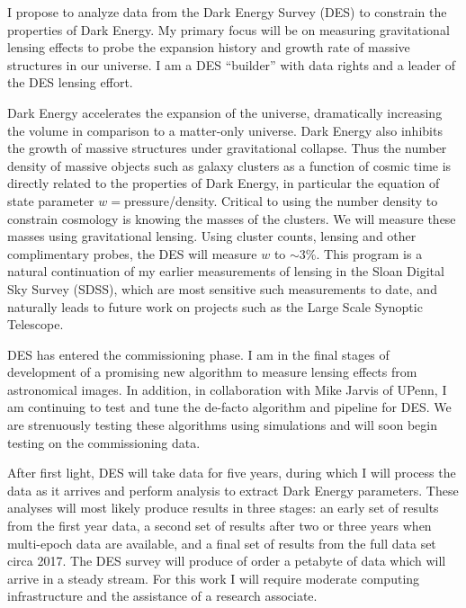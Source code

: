 \documentclass[12pt]{article}
\begin{document}

I propose to analyze data from the Dark Energy Survey (DES) to constrain the
properties of Dark Energy.  My primary focus will be on measuring gravitational
lensing effects to probe the expansion history and growth rate of massive
structures in our universe.  I am a DES ``builder'' with data rights and a
leader of the DES lensing effort.

Dark Energy accelerates the expansion of the universe, dramatically increasing
the volume in comparison to a matter-only universe.  Dark Energy also inhibits
the growth of massive structures under gravitational collapse.  Thus the number
density of massive objects such as galaxy clusters as a function of cosmic time
is directly related to the properties of Dark Energy, in particular the
equation of state parameter $w=$pressure/density.  Critical to using the number
density to constrain cosmology is knowing the masses of the clusters. We will
measure these masses using gravitational lensing.  Using cluster counts,
lensing and other complimentary probes, the DES will measure $w$ to $\sim$3\%.
This program is a natural continuation of my earlier measurements of lensing in
the Sloan Digital Sky Survey (SDSS), which are most sensitive such measurements
to date, and naturally leads to future work on projects such as the Large Scale
Synoptic Telescope\cite{lsstweb}.

DES has entered the commissioning phase.  I am in the final stages of
development of a promising new algorithm to measure lensing effects from
astronomical images.  In addition, in collaboration with Mike Jarvis of UPenn,
I am continuing to test and tune the de-facto algorithm and pipeline for DES.
We are strenuously testing these algorithms using simulations and will soon
begin testing on the commissioning data.

After first light, DES will take data for five years, during which I will
process the data as it arrives and perform analysis to extract Dark Energy
parameters.  These analyses will most likely produce results in three stages:
an early set of results from the first year data, a second set of results after
two or three years when multi-epoch data are available, and a final set of
results from the full data set circa 2017.  The DES survey will produce of
order a petabyte of data which will arrive in a steady stream.  For this work I
will require moderate computing infrastructure and the assistance of a research
associate.
\end{document}
